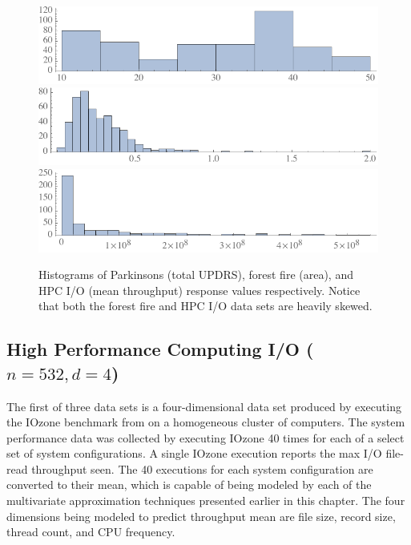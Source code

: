 \begin{figure}
  \centering
  \includegraphics[width=.8\textwidth]{Figures/ACM/p-hist.pdf}
  \includegraphics[width=.8\textwidth]{Figures/ACM/f-hist.pdf}
  \includegraphics[width=.8\textwidth]{Figures/ACM/h-hist.pdf}
  \caption{Histograms of Parkinsons (total UPDRS), forest fire (area), and HPC I/O (mean throughput) response values respectively. Notice that both the forest fire and HPC I/O data sets are heavily skewed.
  \vspace{-.5cm}}
  \label{fig_response_hists}
\end{figure}

\subsection{High Performance Computing I/O ($n = 532, d = 4$)}
The first of three data sets is a four-dimensional data set produced by executing the IOzone benchmark from \cite{iozone} on a homogeneous cluster of computers. The system performance data was collected by executing IOzone 40 times for each of a select set of system configurations. A single IOzone execution reports the max I/O file-read throughput seen. The 40 executions for each system configuration are converted to their mean, which is capable of being modeled by each of the multivariate approximation techniques presented earlier in this chapter. The four dimensions being modeled to predict throughput mean are file size, record size, thread count, and CPU frequency.

